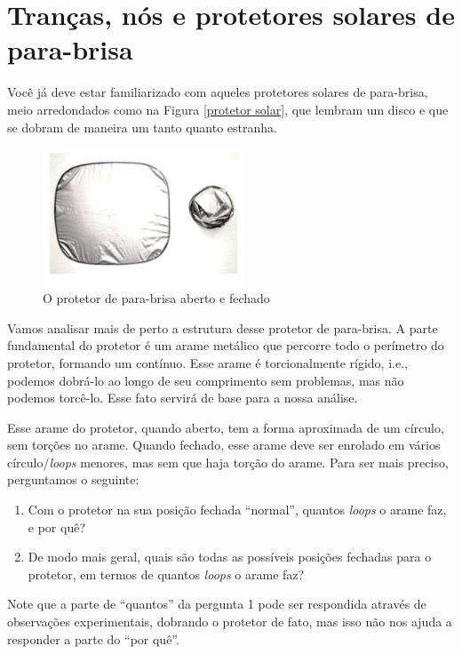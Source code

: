 \section{Tranças, nós e protetores solares de para-brisa}
    Você já deve estar familiarizado com aqueles protetores solares de para-brisa, meio arredondados como 
    na Figura \eqref{protetor solar}, que lembram um disco e que se dobram de maneira um tanto quanto estranha.
	\begin{figure}[H]
		\begin{center}
			\includegraphics[width=6cm]{Images/protetor_solar.png}
		\end{center}\caption{O protetor de para-brisa aberto e fechado}\label{protetor solar}
	\end{figure}
	\par\vspace{0.3cm} Vamos analisar mais de perto a estrutura desse protetor de para-brisa. 
	A parte fundamental do protetor é um arame metálico que percorre todo o perímetro do protetor, formando 
	um  contínuo. Esse arame é torcionalmente rígido, i.e., podemos dobrá-lo ao longo de seu 
	comprimento sem problemas, mas não podemos torcê-lo. Esse fato servirá de base para a nossa análise.
	
	\par\vspace{0.3cm} Esse arame do protetor, quando aberto, tem a forma aproximada de um círculo, sem 
	torções no arame. Quando fechado, esse arame deve ser enrolado em vários círculo/\textit{loops} menores, 
	mas sem que haja torção do arame. Para ser mais preciso, perguntamos o seguinte:
	\begin{enumerate}
		\item Com o protetor na sua posição fechada ``normal'', quantos \textit{loops} o arame faz, e por quê?
		\item De modo mais geral, quais são todas as possíveis posições fechadas para o protetor, em 
		termos de quantos \textit{loops} o arame faz? 
	\end{enumerate} 
	\par\vspace{0.3cm} Note que a parte de ``quantos'' da pergunta 1 pode ser respondida através de observações
	experimentais, dobrando o protetor de fato, mas isso não nos ajuda a responder a parte do ``por quê''.
	
